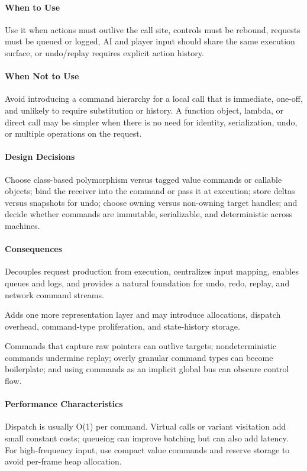 \documentclass[11pt]{article}
\begin{document}
\paragraph{When to Use} Use it when actions must outlive the call site, controls must be rebound, requests must be queued or logged, AI and player input should share the same execution surface, or undo/replay requires explicit action history.
\paragraph{When Not to Use} Avoid introducing a command hierarchy for a local call that is immediate, one-off, and unlikely to require substitution or history. A function object, lambda, or direct call may be simpler when there is no need for identity, serialization, undo, or multiple operations on the request.
\paragraph{Design Decisions} Choose class-based polymorphism versus tagged value commands or callable objects; bind the receiver into the command or pass it at execution; store deltas versus snapshots for undo; choose owning versus non-owning target handles; and decide whether commands are immutable, serializable, and deterministic across machines.
\paragraph{Consequences}
\begin{description}[leftmargin=2.7cm,style=nextline]
\item[Benefits] Decouples request production from execution, centralizes input mapping, enables queues and logs, and provides a natural foundation for undo, redo, replay, and network command streams.
\item[Costs] Adds one more representation layer and may introduce allocations, dispatch overhead, command-type proliferation, and state-history storage.
\item[Risks] Commands that capture raw pointers can outlive targets; nondeterministic commands undermine replay; overly granular command types can become boilerplate; and using commands as an implicit global bus can obscure control flow.
\end{description}
\paragraph{Performance Characteristics} Dispatch is usually O(1) per command. Virtual calls or variant visitation add small constant costs; queueing can improve batching but can also add latency. For high-frequency input, use compact value commands and reserve storage to avoid per-frame heap allocation.
\end{document}

